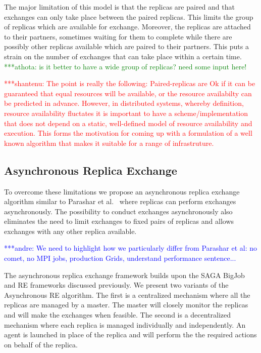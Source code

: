 \documentclass[a4paper,10pt]{article}
\newcommand{\jhanote}[1]{ {\textcolor{red} { ***shantenu: #1 }}}
\newcommand{\alnote}[1]{ {\textcolor{blue} { ***andre: #1 }}}
\newcommand{\athotanote}[1]{ {\textcolor{green} { ***athota: #1 }}}
\newcommand{\alnote}[1]{}
\newcommand{\jhanote}[1]{}
\newcommand{\athotanote}[1]{}
\begin{document}
The major limitation of this model is that the replicas are paired and that exchanges can only take place between the paired replicas. 
This limits the group of replicas which are available for exchange. Moreover, the replicas are attached to their partners, 
sometimes waiting for them to complete while there are possibly other replicas available which are paired to their partners.
This puts a strain on the number of exchanges that can take place within a certain time.  \athotanote{is it better to have a wide group of replicas?
  need some input here!}

\jhanote{The point is really the following: Paired-replicas are Ok if
  it can be guaranteed that equal resources will be available, or the
  resource availabilty can be predicted in advance. However, in
  distributed systems, whereby definition, resource availability
  fluctates it is important to have a scheme/implementation that does
  not depend on a static, well-defined model of resource availability
  and execution. This forms the motivation for coming up with a
  formulation of a well known algorithm that makes it suitable for a
  range of infrastruture.}
  

  
\subsection{Asynchronous Replica Exchange}

To overcome these limitations we propose an asynchronous replica
exchange algorithm similar to Parashar et al.~\cite{parashar_arepex}
where replicas can perform exchanges asynchronously. The possibility
to conduct exchanges asynchronously also eliminates the need to limit
exchanges to fixed pairs of replicas and allows exchanges with any
other replica available.
 
\alnote{We need to highlight how we particularly differ from Parashar
  et al: no comet, no MPI jobs, production Grids, understand
  performance sentence...}

The asynchronous replica exchange framework builds upon the SAGA BigJob and RE frameworks discussed previously.
We present two variants of the Asynchronous RE algorithm. The first is a centralized 
mechanism where all the replicas are managed by a master. The master will closely monitor the replicas and will make the exchanges when feasible. 
The second is a decentralized mechanism where each replica is managed individually and independently. An agent is launched in place of the replica and will perform the the required actions on behalf of the replica.
\end{document}
